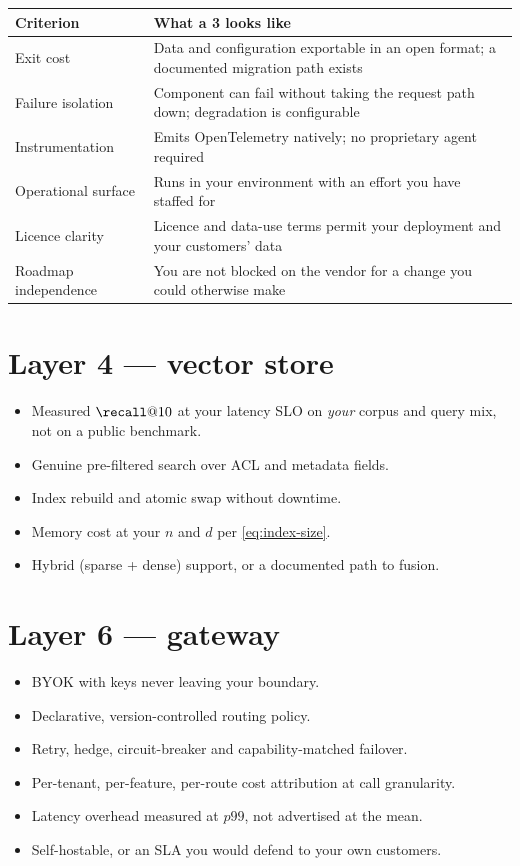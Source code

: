 \documentclass[11pt,twoside,openright]{book}
\theoremstyle{definition}
\theoremstyle{plain}
\theoremstyle{remark}
\begin{document}
\begin{table}[H]
\centering\footnotesize
\renewcommand{\arraystretch}{1.25}
\begin{tabularx}{\textwidth}{@{}p{4.6cm} X@{}}
\toprule
\textbf{Criterion} & \textbf{What a 3 looks like} \\
\midrule
Exit cost & Data and configuration exportable in an open format; a documented migration path exists \\
Failure isolation & Component can fail without taking the request path down; degradation is configurable \\
Instrumentation & Emits OpenTelemetry natively; no proprietary agent required \\
Operational surface & Runs in your environment with an effort you have staffed for \\
Licence clarity & Licence and data-use terms permit your deployment and your customers' data \\
Roadmap independence & You are not blocked on the vendor for a change you could otherwise make \\
\bottomrule
\end{tabularx}
\end{table}

\section{Layer 4 --- vector store}

\begin{itemize}[leftmargin=1.4em,itemsep=1pt]
  \item Measured $\recall@10$ at your latency SLO on \emph{your} corpus and query
        mix, not on a public benchmark.
  \item Genuine pre-filtered search over ACL and metadata fields.
  \item Index rebuild and atomic swap without downtime.
  \item Memory cost at your $n$ and $d$ per \eqref{eq:index-size}.
  \item Hybrid (sparse + dense) support, or a documented path to fusion.
\end{itemize}

\section{Layer 6 --- gateway}

\begin{itemize}[leftmargin=1.4em,itemsep=1pt]
  \item BYOK with keys never leaving your boundary.
  \item Declarative, version-controlled routing policy.
  \item Retry, hedge, circuit-breaker and capability-matched failover.
  \item Per-tenant, per-feature, per-route cost attribution at call granularity.
  \item Latency overhead measured at $p99$, not advertised at the mean.
  \item Self-hostable, or an SLA you would defend to your own customers.
\end{itemize}
\end{document}

